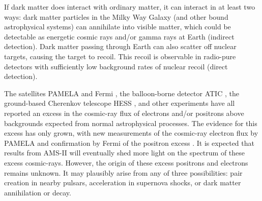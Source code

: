 If dark matter does interact with ordinary matter, it can interact in at least two ways: dark matter particles in the Milky Way Galaxy (and other bound astrophysical systems) can annihilate into visible matter, which could be detectable as energetic cosmic rays and/or gamma rays at Earth (indirect detection).  Dark matter passing through Earth can also scatter off nuclear targets, causing the target to recoil.  This recoil is observable in radio-pure detectors with sufficiently low background rates of nuclear recoil (direct detection).  

The satellites PAMELA \cite{Adriani:2008zr} and Fermi \cite{Ackermann:2010ij}, the balloon-borne detector ATIC \cite{Chang:2008aa}, the ground-based Cherenkov telescope HESS \cite{Aharonian:2008aa,Aharonian:2009ah}, and other experiments have all reported an excess in the cosmic-ray flux of electrons and/or positrons above backgrounds expected from normal astrophysical processes.  The evidence for this excess has only grown, with new measurements of the cosmic-ray electron flux by PAMELA \cite{Adriani:2011xv} and confirmation by Fermi of the positron excess \cite{FermiLAT:2011ab}.  It is expected that results from AMS-II will eventually shed more light on the spectrum of these excess cosmic-rays.  However, the origin of these excess positrons and electrons remains unknown.  It may plausibly arise from any of three possibilities: pair creation in nearby pulsars, acceleration in supernova shocks, or dark matter annihilation or decay.

